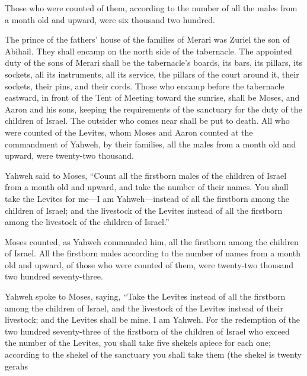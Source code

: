 {Those who were counted of them, according to the number of all the males from a month old and upward, were six thousand two hundred.
\par }{\PP {}The prince of the fathers’ house of the families of Merari was Zuriel the son of Abihail. They shall encamp on the north side of the tabernacle.
The appointed duty of the sons of Merari shall be the tabernacle’s boards, its bars, its pillars, its sockets, all its instruments, all its service,
the pillars of the court around it, their sockets, their pins, and their cords.
Those who encamp before the tabernacle eastward, in front of the Tent of Meeting toward the sunrise, shall be Moses, and Aaron and his sons, keeping the requirements of the sanctuary for the duty of the children of Israel. The outsider who comes near shall be put to death.
All who were counted of the Levites, whom Moses and Aaron counted at the commandment of Yahweh, by their families, all the males from a month old and upward, were twenty-two thousand.
\par }{\PP {}Yahweh said to Moses, “Count all the firstborn males of the children of Israel from a month old and upward, and take the number of their names.
You shall take the Levites for me—I am Yahweh—instead of all the firstborn among the children of Israel; and the livestock of the Levites instead of all the firstborn among the livestock of the children of Israel.”
\par }{\PP {}Moses counted, as Yahweh commanded him, all the firstborn among the children of Israel.
All the firstborn males according to the number of names from a month old and upward, of those who were counted of them, were twenty-two thousand two hundred seventy-three.
\par }{\PP {}Yahweh spoke to Moses, saying,
“Take the Levites instead of all the firstborn among the children of Israel, and the livestock of the Levites instead of their livestock; and the Levites shall be mine. I am Yahweh.
For the redemption of the two hundred seventy-three of the firstborn of the children of Israel who exceed the number of the Levites,
you shall take five shekels apiece for each one; according to the shekel of the sanctuary you shall take them (the shekel is twenty gerahs}
